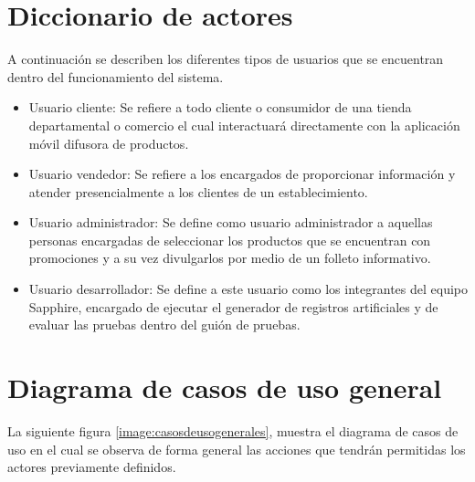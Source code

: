 \section{Diccionario de actores}
A continuación se describen los diferentes tipos de usuarios que se encuentran dentro del funcionamiento del sistema.\\

\begin{itemize}
\item Usuario cliente: Se refiere a todo cliente o consumidor de una tienda departamental o comercio el cual interactuará directamente con la aplicación móvil difusora de productos.
\item Usuario vendedor: Se refiere a los encargados de proporcionar información y atender presencialmente a los clientes de un establecimiento.
\item Usuario administrador: Se define como usuario administrador a aquellas personas encargadas de seleccionar los productos que se encuentran con promociones y a su vez divulgarlos por medio de un folleto informativo.

\item Usuario desarrollador: Se define a este usuario como los integrantes del equipo Sapphire, encargado de ejecutar el generador de registros artificiales y de evaluar las pruebas dentro del guión de pruebas.
\end{itemize}
\section{Diagrama de casos de uso general}
La siguiente figura \ref{image:casosdeusogenerales}, muestra el diagrama de casos de uso en el cual se observa de forma general las acciones que tendrán permitidas los actores previamente definidos.

